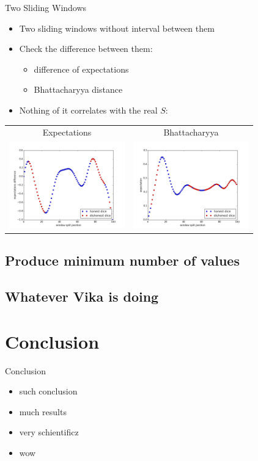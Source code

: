 \documentclass[hyperref=unicode,graphics=pdflatex,13pt]{beamer}
\begin{document}
\begin{frame}{Two Sliding Windows}
\begin{itemize}
   \item Two sliding windows without interval between them
   \item Check the difference between them:
   \begin{itemize}
      \item difference of expectations
      \item Bhattacharyya distance
   \end{itemize}
   \item Nothing of it correlates with the real $S$:
\end{itemize}
\begin{tabular}{cc}
 Expectations & Bhattacharyya \\
 \includegraphics[width = 5cm]{two_windows_expectation.png} &
 \includegraphics[width = 5cm]{two_windows_bhattacharyya.png}
\end{tabular}


\end{frame}

\subsection{Produce minimum number of values}

\subsection{Whatever Vika is doing}

\section{Conclusion} %

\begin{frame}{Conclusion}
 \begin{itemize}
  \item such conclusion
  \item much results
  \item very schientificz
  \item wow
 \end{itemize}

\end{frame}
\end{document}
